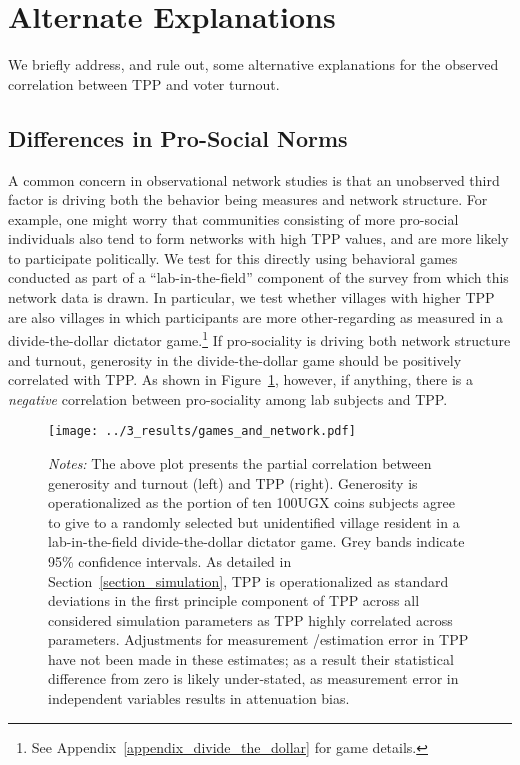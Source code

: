 \documentclass[12pt]{article}
\begin{document}
\section{Alternate Explanations}

We briefly address, and rule out, some alternative explanations for the observed correlation between TPP and voter turnout.


\subsection{Differences in Pro-Social Norms}

A common concern in observational network studies is that an unobserved third factor is driving both the behavior being measures and network structure. For example, one might worry that communities consisting of more pro-social individuals also tend to form networks with high TPP values, and are more likely to participate politically. We test for this directly using behavioral games conducted as part of a ``lab-in-the-field'' component of the survey from which this network data is drawn. In particular, we test whether villages with higher TPP are also villages in which participants are more other-regarding as measured in a divide-the-dollar dictator game.\footnote{See Appendix~\ref{appendix_divide_the_dollar} for game details.} If pro-sociality is driving both network structure and turnout, generosity in the divide-the-dollar game should be positively correlated with TPP. As shown in Figure~\ref{figure_generosity}, however, if anything, there is a \emph{negative} correlation between pro-sociality among lab subjects and TPP.

\begin{figure}[!h]
	\begin{center}
	    \caption{}\label{figure_generosity}
    		\texttt{[image: ../3\_results/games\_and\_network.pdf]}
    \end{center}
	\scriptsize{\emph{Notes:}  The above plot presents the partial correlation between generosity and turnout (left) and TPP (right). Generosity is operationalized as the portion of ten 100UGX coins subjects agree to give to a randomly selected but unidentified village resident in a lab-in-the-field divide-the-dollar dictator game.  Grey bands indicate 95\% confidence intervals. As detailed in Section~\ref{section_simulation}, TPP is operationalized as standard deviations in the first principle component of TPP across all considered simulation parameters as TPP highly correlated across parameters. Adjustments for measurement /estimation error in TPP have not been made in these estimates; as a result their statistical difference from zero is likely under-stated, as measurement error in independent variables results in attenuation bias.}
\end{figure}
\end{document}
